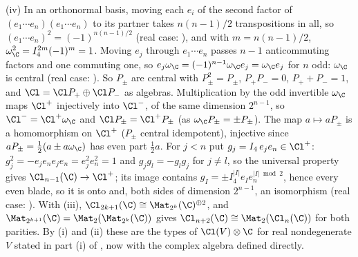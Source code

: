 (iv) In an orthonormal basis, moving each $e_i$ of the second factor of $(e_1 \cdots e_n)(e_1 \cdots e_n)$ to its partner takes $n(n-1)/2$ transpositions in all, so $(e_1 \cdots e_n)^{2} = (-1)^{n(n-1)/2}$ (real case: ), and with $m = n(n-1)/2$, $\omega_\C^{2} = I_4^{2m}(-1)^{m} = 1$. Moving $e_j$ through $e_1 \cdots e_n$ passes $n - 1$ anticommuting factors and one commuting one, so $e_j \omega_\C = (-1)^{n-1}\omega_\C e_j = \omega_\C e_j$ for $n$ odd: $\omega_\C$ is central (real case: ). So $P_\pm$ are central with $P_\pm^{2} = P_\pm$, $P_+P_- = 0$, $P_+ + P_- = 1$, and $\Cl = \Cl P_+ \oplus \Cl P_-$ as algebras. Multiplication by the odd invertible $\omega_\C$ maps $\Cl^{+}$ injectively into $\Cl^{-}$, of the same dimension $2^{n-1}$, so $\Cl^{-} = \Cl^{+}\omega_\C$ and $\Cl P_\pm = \Cl^{+} P_\pm$ (as $\omega_\C P_\pm = \pm P_\pm$). The map $a \mapsto a P_\pm$ is a homomorphism on $\Cl^{+}$ ($P_\pm$ central idempotent), injective since $aP_\pm = \tfrac12(a \pm a\omega_\C)$ has even part $\tfrac12 a$. For $j < n$ put $g_j = I_4\, e_j e_n \in \Cl^{+}$: $g_j^{2} = -e_j e_n e_j e_n = e_j^{2} e_n^{2} = 1$ and $g_j g_l = -g_l g_j$ for $j \ne l$, so the universal property gives $\Cl_{n-1}(\C) \to \Cl^{+}$; its image contains $g_I = \pm I_4^{\lvert I\rvert} e_I e_n^{\lvert I \rvert \bmod 2}$, hence every even blade, so it is onto and, both sides of dimension $2^{n-1}$, an isomorphism (real case: ). With (iii), $\Cl_{2k+1}(\C) \cong \Mat_{2^{k}}(\C)^{\oplus 2}$, and $\Mat_{2^{k+1}}(\C) = \Mat_2(\Mat_{2^{k}}(\C))$ gives $\Cl_{n+2}(\C) \cong \Mat_2(\Cl_n(\C))$ for both parities. By (i) and (ii) these are the types of $\Cl(V) \otimes \C$ for real nondegenerate $V$ stated in part (i) of , now with the complex algebra defined directly.


